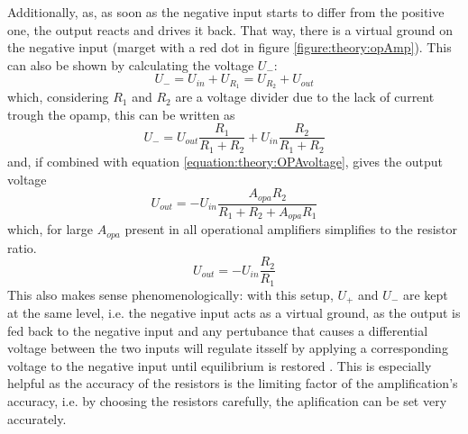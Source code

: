                 Additionally, as, as soon as the negative input starts to differ from the positive one, the output reacts and drives it back. That way, there is a virtual ground on the negative input (marget with a red dot in figure \ref{figure:theory:opAmp}).
                This can also be shown by calculating the voltage $U_-$:
                \begin{equation}
                    U_- = U_{in} + U_{R_1} = U_{R_2} + U_{out}
                \end{equation}
                which, considering $R_1$ and $R_2$ are a voltage divider due to the lack of current trough the opamp, this can be written as
                \begin{equation}
                    U_{-} = U_{out} \frac{R_1}{R_1+R_2} + U_{in} \frac{R_2}{R_1+R_2}
                \end{equation}
                and, if combined with equation \ref{equation:theory:OPAvoltage}, gives the output voltage
                \begin{equation}
                    U_{out} = -U_{in} \frac{A_{opa}R_2}{R_1+R_2 + A_{opa}R_1}
                \end{equation}
                which, for large $A_{opa}$ present in all operational amplifiers simplifies to the resistor ratio.
                \begin{equation}
                    U_{out} = -U_{in}\frac{R_2}{R_1}
                \end{equation}
                This also makes sense phenomenologically: with this setup, $U_{+}$ and $U_{-}$ are kept at the same level, i.e. the negative input acts as a virtual ground, as the output is fed back to the negative input and any pertubance that causes a differential voltage between the two inputs will regulate itsself by applying a corresponding voltage to the negative input until equilibrium is restored \cite{huijsing_operational_2017-1}.
                This is especially helpful as the accuracy of the resistors is the limiting factor of the amplification's accuracy, i.e. by choosing the resistors carefully, the aplification can be set very accurately.
